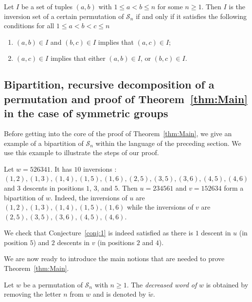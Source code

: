 \documentclass[ALCO,Unicode]{cedram}
\theoremstyle{definition}
\newcommand{\Sym}[1]{\mathcal{S}_{#1}}
\newcommand{\Symn}{\Sym{n}}
\newcommand{\dec}[1]{\widetilde{#1}}
\begin{document}
\begin{prop}
\label{prop:invs}
Let $I$ be a set of tuples $(a,b)$ with $1 \leq a < b \leq n$ for some $n \geq 1$. Then $I$ is the inversion set of a certain permutation of $\Symn$ if and only if it satisfies the following conditions for all $1 \leq a < b < c \leq n$

\begin{enumerate}
\item $(a,b) \in I$ and $(b,c) \in I$ implies that $(a,c) \in I$;
\label{prop-item:invs-trans}
\item $(a,c) \in I$ implies that either $(a,b) \in I$, or $(b,c) \in I$.
\label{prop-item:invs-planar}
\end{enumerate}
\end{prop}

\subsection{Bipartition, recursive decomposition of a permutation and proof of Theorem~\ref{thm:Main} in the case of symmetric groups}

Before getting into the core of the proof of Theorem~\ref{thm:Main}, we give an example of a bipartition of $\Symn$ within the language of the preceding section. We use this example to illustrate the steps of our proof. 


\begin{ex}\label{ex:TypeA} 
Let $w = 526341$. It has $10$ inversions : $(1,2), (1,3), (1,4), (1,5), (1,6), (2,5), (3,5), (3,6), (4,5), (4,6)$ and $3$ descents in positions $1$, $3$, and $5$. Then $u = 234561$ and $v = 152634$ form a bipartition of $w$. Indeed, the inversions of $u$ are $(1,2),  (1,3), (1,4), (1,5), (1,6)$ while the inversions of $v$ are $(2,5), (3,5), (3,6), (4,5), (4,6)$.

We check that Conjecture~\ref{conj:1} is indeed satisfied as there is $1$ descent in $u$ (in position $5$) and $2$ descents in $v$ (in positions $2$ and $4$). 
\end{ex}


We are now ready to introduce  the main notions that are needed to prove Theorem~\ref{thm:Main}. 

\begin{defi}
Let $w$ be a permutation of $\Symn$ with $n \geq 1$. The \emph{decreased word of}  $w$ is obtained by removing the letter $n$ from $w$ and is denoted by $\dec{w}$.
\end{defi}
\end{document}
